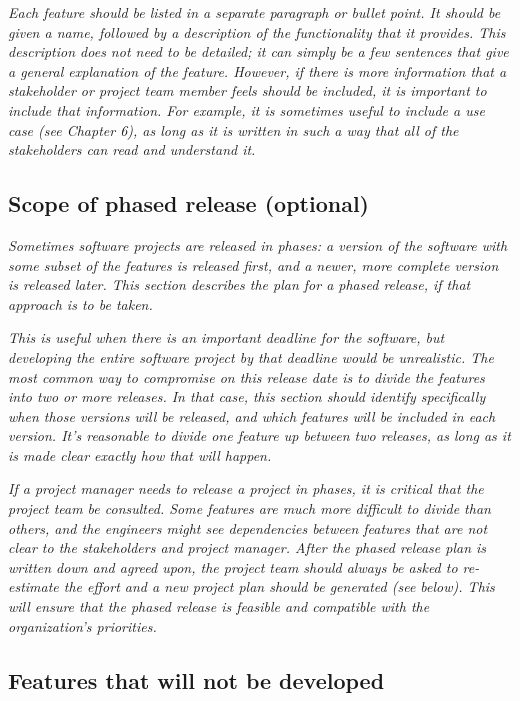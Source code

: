 \documentclass[12pt]{article}
\begin{document}
    \textit{Each feature should be listed in a separate paragraph or bullet
    point. It should be given a name, followed by a description of the
    functionality that it provides. This description does not need to
    be detailed; it can simply be a few sentences that give a general
    explanation of the feature. However, if there is more information
    that a stakeholder or project team member feels should be
    included, it is important to include that information. For
    example, it is sometimes useful to include a use case (see Chapter
    6), as long as it is written in such a way that all of the
    stakeholders can read and understand it.}

\subsection{Scope of phased release (optional)}

    \textit{Sometimes software projects are released in phases: a version of
    the software with some subset of the features is released first,
    and a newer, more complete version is released later. This section
    describes the plan for a phased release, if that approach is to be
    taken.}

    \textit{This is useful when there is an important deadline for the
    software, but developing the entire software project by that
    deadline would be unrealistic. The most common way to compromise
    on this release date is to divide the features into two or more
    releases. In that case, this section should identify specifically
    when those versions will be released, and which features will be
    included in each version. It's reasonable to divide one feature up
    between two releases, as long as it is made clear exactly how that
    will happen.}

    \textit{If a project manager needs to release a project in phases, it is
    critical that the project team be consulted. Some features are
    much more difficult to divide than others, and the engineers might
    see dependencies between features that are not clear to the
    stakeholders and project manager. After the phased release plan is
    written down and agreed upon, the project team should always be
    asked to re-estimate the effort and a new project plan should be
    generated (see below). This will ensure that the phased release is
    feasible and compatible with the organization's priorities.}

\subsection{Features that will not be developed}
\end{document}
